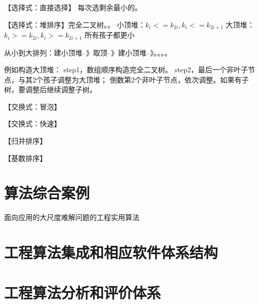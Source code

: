 \documentclass[UTF8]{../computerUniverse}
\begin{document}
【选择式：直接选择】
每次选剩余最小的。

【选择式：堆排序】完全二叉树。。
小顶堆：$k_i<=k_{2i}, k_i<=k_{2i+1}$
大顶堆：$k_i>=k_{2i}, k_i>=k_{2i+1}$ 所有孩子都更小

从小到大排列：建小顶堆--》取顶--》建小顶堆--》。。。。

例如构造大顶堆：
step1，数组顺序构造完全二叉树。
step2，最后一个非叶子节点，与其2个孩子调整为大顶堆；
       倒数第2个非叶子节点，依次调整。如果有子树，要调整后继续调整子树。
       




【交换式：冒泡】

【交换式：快速】



【归并排序】

【基数排序】




\chapter{算法综合案例}
面向应用的大尺度难解问题的工程实用算法


\chapter{工程算法集成和相应软件体系结构}

\chapter{工程算法分析和评价体系}
\end{document}

